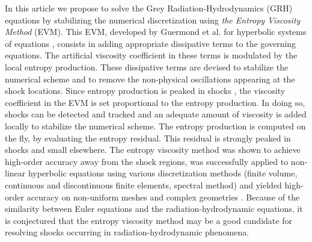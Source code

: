 \documentclass[review]{elsarticle}
\begin{document}
In this article we propose to solve the Grey Radiation-Hydrodynamics (GRH) equations by stabilizing the numerical discretization using \emph{the Entropy Viscosity Method} (EVM). This EVM, developed by Guermond et al. for hyperbolic systems of equations \cite{jlg1, jlg2}, consists in adding appropriate dissipative terms to the governing equations.  The artificial viscosity coefficient in these terms is modulated by the local entropy production. These dissipative terms are devised to stabilize the numerical scheme and to remove the non-physical oscillations appearing at the shock locations. Since entropy production is peaked in shocks \cite{Toro}, the  viscosity coefficient in the EVM is set proportional to the entropy production. In doing so, shocks can be detected and tracked and an adequate amount of viscosity is added locally to stabilize the numerical scheme. The entropy production is computed on the fly, by evaluating the entropy residual. This residual is strongly peaked in shocks and small elsewhere. 
The entropy viscosity method was shown to achieve high-order accuracy away from the shock regions, was successfully applied to non-linear hyperbolic equations using various discretization methods (finite volume, continuous and discontinuous finite elements, spectral method) and yielded high-order accuracy on non-uniform meshes and complex geometries \cite{jlg2, valentin}. Because of the similarity between Euler equations and the radiation-hydrodynamic equations, it is conjectured that the entropy viscosity method may be a good candidate for resolving shocks occurring in radiation-hydrodynamic phenomena.
\end{document}
